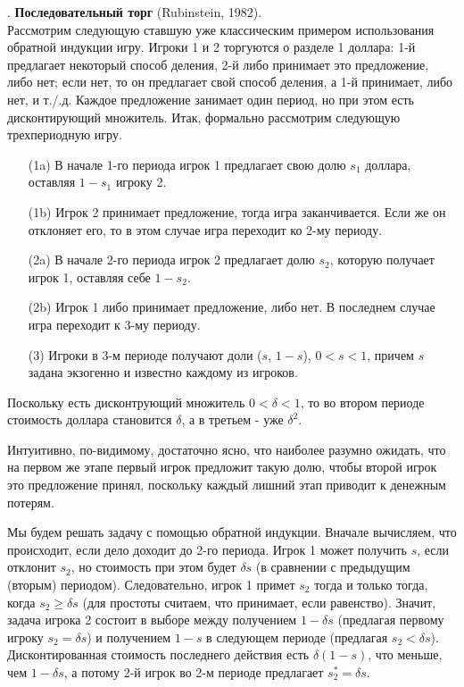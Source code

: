 . {\bf Последовательный торг} (Rubinstein, 1982).\\
Рассмотрим следующую ставшую уже классическим примером использования
обратной индукции игру. Игроки 1 и 2 торгуются о разделе 1
доллара: 1-й предлагает некоторый способ деления, 2-й либо
принимает это предложение, либо нет; если нет, то он предлагает свой
способ деления, а 1-й принимает, либо нет, и т./.д. Каждое предложение
занимает один период, но при этом есть дисконтирующий множитель.
Итак, формально рассмотрим следующую трехпериодную игру.
\begin{itemize}
\item[(1a)] В начале 1-го периода игрок 1 предлагает
свою долю $s_1$ доллара, оставляя $1-s_1$ игроку 2.

\item[(1b)] Игрок 2 принимает предложение, тогда игра заканчивается.
Если же он отклоняет его, то в этом случае игра переходит ко 2-му периоду.

\item[(2a)] В начале 2-го периода игрок 2 предлагает долю $s_2$,
которую получает игрок 1, оставляя себе $1-s_2$.

\item[(2b)] Игрок 1 либо принимает предложение, либо нет. В последнем
случае игра переходит к 3-му периоду.

\item[(3)] Игроки в 3-м периоде получают доли ($s$, $1-s$), $0<s<1$,
причем $s$ задана экзогенно и известно каждому из игроков.
\end{itemize}

Поскольку есть дисконтрующий множитель $0< \delta <1$, то во
втором периоде стоимость доллара становится $\delta$, а в третьем - уже $\delta^2$.

Интуитивно, по-видимому, достаточно ясно, что наиболее разумно ожидать,
что на первом же этапе первый игрок предложит такую долю,
чтобы второй игрок это предложение принял, поскольку каждый
лишний этап приводит к денежным потерям.

Мы будем решать задачу с помощью обратной индукции. Вначале
вычисляем, что происходит, если дело доходит до 2-го периода. Игрок
1 может получить $s$, если отклонит $s_2$, но стоимость при этом
будет $\delta s$ (в сравнении с предыдущим (вторым) периодом).
Следовательно, игрок 1 примет $s_2$ тогда и только тогда, когда
$s_2\ge \delta s$ (для простоты считаем, что принимает, если равенство). Значит,
задача игрока 2 состоит в выборе между получением $1-\delta s$
(предлагая первому игроку  $s_2=\delta s$) и получением $1-s$ в
следующем периоде (предлагая $s_2<\delta s$).  Дисконтированная
стоимость последнего действия есть $\delta(1-s)$, что меньше,
чем $1-\delta s$, а потому 2-й игрок во 2-м периоде предлагает
$s_2^*=\delta s$.

